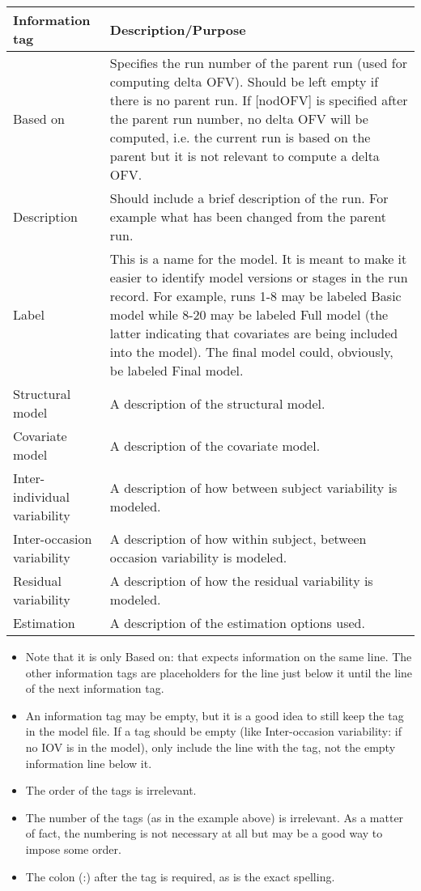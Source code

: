 \begin{longtable}{p{3cm}p{9.5cm}}
\hline
Information tag & Description/Purpose \\
\hline
Based on & Specifies the run number of the parent run (used for computing delta OFV). Should be left empty if there is no parent run. If [nodOFV] is specified after the parent run number, no delta OFV will be computed, i.e. the current run is based on the parent but it is not relevant to compute a delta OFV.\\
\hline
Description & Should include a brief description of the run. For example what has been changed from the parent run. \\
\hline
Label & This is a name for the model. It is meant to make it easier to identify model versions or stages in the run record. For example, runs 1-8 may be labeled Basic model while 8-20 may be labeled Full model (the latter indicating that covariates are being included into the model). The final model could, obviously, be labeled Final model. \\
\hline
Structural model & A description of the structural model. \\
\hline
Covariate model & A description of the covariate model. \\
\hline
Inter-individual variability & A description of how between subject variability is modeled. \\
\hline
Inter-occasion variability & A description of how within subject, between occasion variability is modeled. \\
\hline
Residual variability & A description of how the residual variability is modeled. \\
\hline
Estimation & A description of the estimation options used. \\
\hline
\end{longtable}

\begin{itemize}
\item Note that it is only Based on: that expects information on the same line. The other information tags are placeholders for the line just below it until the line of the next information tag.
\item An information tag may be empty, but it is a good idea to still keep the tag in the model file.  If a tag should be empty (like Inter-occasion variability: if no IOV is in the model), only include the line with the tag, not the empty information line below it.
\item The order of the tags is irrelevant.
\item The number of the tags (as in the example above) is irrelevant. As a matter of fact, the numbering is not necessary at all but may be a good way to impose some order.
\item The colon (:) after the tag is required, as is the exact spelling.
\end{itemize}
